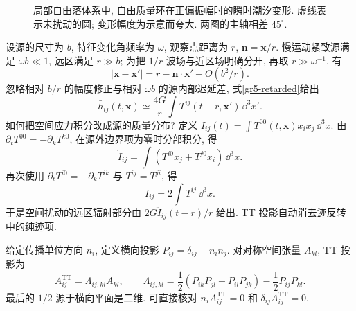\begin{figure}[htbp]
\centering
{}
\caption{局部自由落体系中, 自由质量环在正偏振幅时的瞬时潮汐变形. 虚线表示未扰动的圆; 变形幅度为示意而夸大. 两图的主轴相差 $45^\circ$.}
\label{gr5-polarization-ring}
\end{figure}


设源的尺寸为 $b$, 特征变化角频率为 $\omega$, 观察点距离为 $r$, $\boldsymbol n=\boldsymbol x/r$. 慢运动紧致源满足 $\omega b\ll1$, 远区满足 $r\gg b$; 为把 $1/r$ 波场与近区场明确分开, 再取 $r\gg\omega^{-1}$. 有
\[
 |\boldsymbol x-\boldsymbol x'|=r-\boldsymbol n\cdot\boldsymbol x'+O(b^2/r).
\]
忽略相对 $b/r$ 的幅度修正与相对 $\omega b$ 的源内部迟延差, 式\eqref{gr5-retarded}给出
\begin{equation}\label{gr5-far-integral}
 \bar h_{ij}(t,\boldsymbol x)\simeq\frac{4G}{r}\int T^{ij}(t-r,\boldsymbol x')\,\dd^3x'.
\end{equation}
如何把空间应力积分改成源的质量分布? 定义 $I_{ij}(t)=\int T^{00}(t,\boldsymbol x)x_ix_j\,\dd^3x$. 由 $\partial_tT^{00}=-\partial_kT^{k0}$, 在源外边界项为零时分部积分, 得
\[
 \dot I_{ij}=\int(T^{i0}x_j+T^{j0}x_i)\,\dd^3x.
\]
再次使用 $\partial_tT^{i0}=-\partial_kT^{ik}$ 与 $T^{ij}=T^{ji}$, 得
\[
 \ddot I_{ij}=2\int T^{ij}\,\dd^3x.
\]
于是空间扰动的远区辐射部分由 $2G\ddot I_{ij}(t-r)/r$ 给出. TT 投影自动消去迹反转中的纯迹项.

\begin{definition}
给定传播单位方向 $n_i$, 定义横向投影 $P_{ij}=\delta_{ij}-n_in_j$. 对对称空间张量 $A_{kl}$, TT 投影为
\[
 A^{\mathrm{TT}}_{ij}=\Lambda_{ij,kl}A_{kl},\qquad
 \Lambda_{ij,kl}=\frac12(P_{ik}P_{jl}+P_{il}P_{jk})-\frac12P_{ij}P_{kl}.
\]
最后的 $1/2$ 源于横向平面是二维. 可直接核对 $n_iA^{\mathrm{TT}}_{ij}=0$ 和 $\delta_{ij}A^{\mathrm{TT}}_{ij}=0$.
\end{definition}

